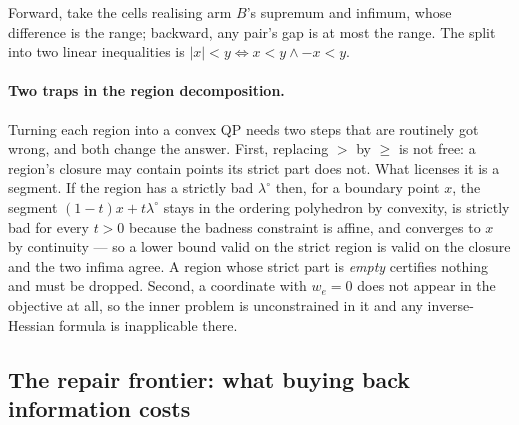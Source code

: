 Forward, take the cells realising arm $B$'s supremum and infimum, whose difference is the
range; backward, any pair's gap is at most the range. The split into two linear inequalities
is $|x|<y\iff x<y\wedge-x<y$.



\paragraph{Two traps in the region decomposition.}
Turning each region into a convex QP needs two steps that are routinely got wrong, and both
change the answer. First, replacing $>$ by $\ge$ is not free: a region's closure may contain
points its strict part does not. What licenses it is a segment. If the region has a strictly
bad $\lambda^{\circ}$ then, for a boundary point $x$, the segment
$(1-t)x+t\lambda^{\circ}$ stays in the ordering polyhedron by convexity, is strictly bad for
every $t>0$ because the badness constraint is affine, and converges to $x$ by continuity ---
so a lower bound valid on the strict region is valid on the closure and the two infima agree.
A region whose strict part is \emph{empty} certifies nothing and must be dropped. Second, a
coordinate with $w_{e}=0$ does not appear in the objective at all, so the inner problem is
unconstrained in it and any inverse-Hessian formula is inapplicable there.


\subsection{The repair frontier: what buying back information costs}
\label{sec:frontier}

